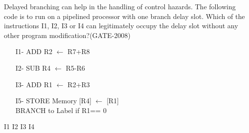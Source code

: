 \begin{questyle}
  \question  Delayed branching can help in the handling of control hazards. The following code is
             to run on a pipelined processor with one branch delay slot. Which of the instructions
             I1, I2, I3 or I4 can legitimately occupy the delay slot without any other program modification?(GATE-2008)

             \begin{enumerate}
                \item[I1-] ADD R2 \(\leftarrow\) R7+R8
                \item[I2-] SUB R4 \(\leftarrow\) R5-R6
                \item[I3-] ADD R1 \(\leftarrow\) R2+R3
                \item[I5-] STORE Memory [R4] \(\leftarrow\) [R1] \\
                 BRANCH to Label if R1== 0
            \end{enumerate}

  \begin{oneparchoices}
    \choice         I1
    \choice         I2
    \choice         I3
    \CorrectChoice  I4
  \end{oneparchoices}
\end{questyle}


\begin{comment}


\begin{questyle}
  \question  zzz  (GATE-zzz)

  \begin{choices}
    \choice         zzz
    \choice         zzz
    \choice         zzz
    \choice         zzz
    \CorrectChoice
  \end{choices}
\end{questyle}

\begin{questyle}
  \question  zzz  (GATE-zzz)

  \begin{choices}
    \choice         zzz
    \choice         zzz
    \choice         zzz
    \choice         zzz
    \CorrectChoice
  \end{choices}
\end{questyle}


\end{comment}




